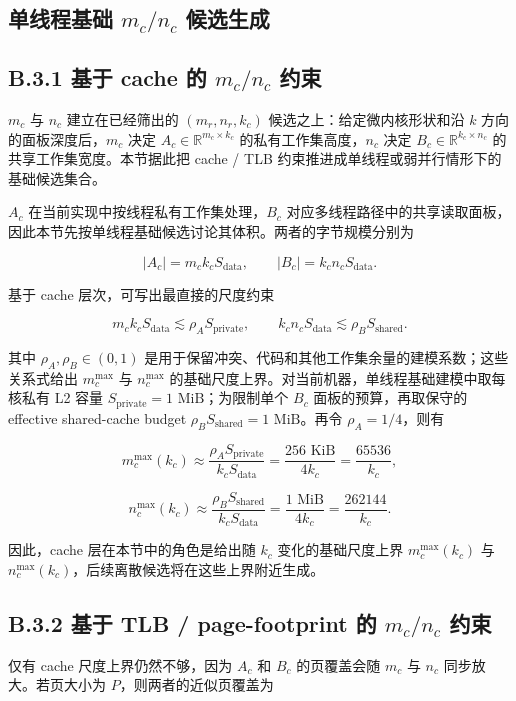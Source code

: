 \documentclass[a4paper,11pt,oneside]{article}
\begin{document}
\subsection{单线程基础 $m_c/n_c$ 候选生成}

\subsection*{B.3.1 基于 cache 的 $m_c/n_c$ 约束}

$m_c$ 与 $n_c$ 建立在已经筛出的 $(m_r,n_r,k_c)$ 候选之上：给定微内核形状和沿 $k$ 方向的面板深度后，$m_c$ 决定 $A_c \in \mathbb{R}^{m_c \times k_c}$ 的私有工作集高度，$n_c$ 决定 $B_c \in \mathbb{R}^{k_c \times n_c}$ 的共享工作集宽度。本节据此把 cache / TLB 约束推进成单线程或弱并行情形下的基础候选集合。

$A_c$ 在当前实现中按线程私有工作集处理，$B_c$ 对应多线程路径中的共享读取面板，因此本节先按单线程基础候选讨论其体积。两者的字节规模分别为

$$
|A_c| = m_c k_c S_{\text{data}},
\qquad
|B_c| = k_c n_c S_{\text{data}}.
$$

基于 cache 层次，可写出最直接的尺度约束

$$
m_c k_c S_{\text{data}} \lesssim \rho_A S_{\text{private}},
\qquad
k_c n_c S_{\text{data}} \lesssim \rho_B S_{\text{shared}}.
$$

其中 $\rho_A,\rho_B \in (0,1)$ 是用于保留冲突、代码和其他工作集余量的建模系数；这些关系式给出 $m_c^{\max}$ 与 $n_c^{\max}$ 的基础尺度上界。对当前机器，单线程基础建模中取每核私有 L2 容量 $S_{\text{private}}=1\text{ MiB}$；为限制单个 $B_c$ 面板的预算，再取保守的 effective shared-cache budget $\rho_B S_{\text{shared}} = 1\text{ MiB}$。再令 $\rho_A = 1/4$，则有

$$
m_c^{\max}(k_c) \approx \frac{\rho_A S_{\text{private}}}{k_c S_{\text{data}}}
= \frac{256\text{ KiB}}{4k_c}
= \frac{65536}{k_c},
$$

$$
n_c^{\max}(k_c) \approx \frac{\rho_B S_{\text{shared}}}{k_c S_{\text{data}}}
= \frac{1\text{ MiB}}{4k_c}
= \frac{262144}{k_c}.
$$

因此，cache 层在本节中的角色是给出随 $k_c$ 变化的基础尺度上界 $m_c^{\max}(k_c)$ 与 $n_c^{\max}(k_c)$，后续离散候选将在这些上界附近生成。

\subsection*{B.3.2 基于 TLB / page-footprint 的 $m_c/n_c$ 约束}

仅有 cache 尺度上界仍然不够，因为 $A_c$ 和 $B_c$ 的页覆盖会随 $m_c$ 与 $n_c$ 同步放大。若页大小为 $P$，则两者的近似页覆盖为
\end{document}
